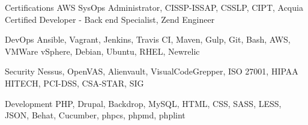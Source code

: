 


\begin{cvskills}


\cvskill
{Certifications}
{AWS SysOps Administrator, CISSP-ISSAP, CSSLP, CIPT, Acquia Certified Developer - Back end Specialist, Zend Engineer }

\cvskill
{DevOps}
{Ansible, Vagrant, Jenkins, Travis CI, Maven, Gulp, Git, Bash, AWS, VMWare vSphere, Debian, Ubuntu, RHEL, Newrelic }

\cvskill
{Security}
{Nessus, OpenVAS, Alienvault, VisualCodeGrepper, ISO 27001, HIPAA HITECH, PCI-DSS, CSA-STAR, SIG }

\cvskill
{Development}
{PHP, Drupal, Backdrop, MySQL, HTML, CSS, SASS, LESS, JSON, Behat, Cucumber, phpcs, phpmd, phplint }




\end{cvskills}
